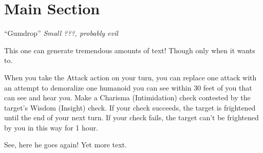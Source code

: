 

{\vspace{-3em}}

\section{Main Section}

\lipsum[1]

\newpage

\lipsum[1]

\newpage

\lipsum[1]

\newpage


\begin{monsterbox}{“Gumdrop”}
	\textit{Small ???, probably evil}\\
	\hline
	\basics[%
	armorclass = 13,
	hitpoints  = 33,
	speed      = 30 ft
	]
	\hline
	\stats[
	STR = \stat{12}, %
	DEX = \stat{14},
	CON = \stat{10},
	INT = \stat{13},
	WIS = \stat{12},
	CHA = \stat{20}
	]
	\hline
	\details[%
	senses = {Darkvision 60 ft},
	languages = {Common, Infernal, Sylvan, Draconic, Undercommon, Slaad, Spider (verbal and telepathic)},
	conditionimmunities = {Charmed},
	]
	\begin{monsteraction}
		This one can generate tremendous amounts of text! Though only when it wants to.
	\end{monsteraction}
	\begin{monsteraction}[Menacing]
		When you take the Attack action on your turn, you can replace one attack with an attempt to demoralize one humanoid you can see within 30 feet of you that can see and hear you. Make a Charisma (Intimidation) check contested by the target's Wisdom (Insight) check. If your check succeeds, the target is frightened until the end of your next turn. If your check fails, the target can't be frightened by you in this way for 1 hour.
	\end{monsteraction}

	\begin{monsteraction}
	See, here he goes again! Yet more text.
	\end{monsteraction}
\end{monsterbox}

\clearpage
